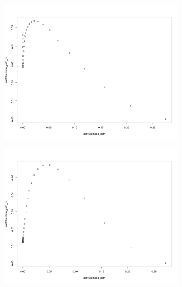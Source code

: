 \documentclass[letterpaper]{article}
\begin{document}
\begin{figure}[H]
\centering
\begin{subfigure}{0.5\textwidth}
  \centering
  \includegraphics[width=1\linewidth]{./result_plot/ll_use_k/5wrong_path_plot}
\end{subfigure}%
\begin{subfigure}{.5\textwidth}
  \centering
  \includegraphics[width=1\linewidth]{./result_plot/ll_use_k/6wrong_path_plot}
\end{subfigure}

\end{figure}
\end{document}
